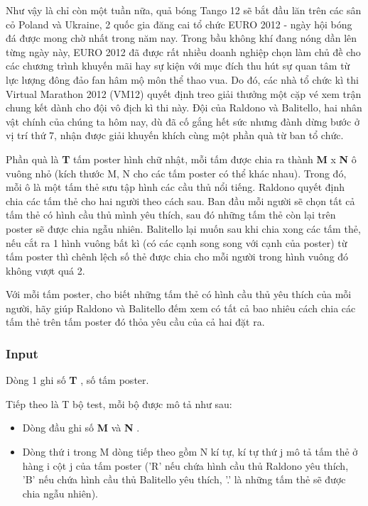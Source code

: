

Như vậy là chỉ còn một tuần nữa, quả bóng Tango 12 sẽ bắt đầu lăn trên các sân cỏ Poland và Ukraine, 2 quốc gia đăng cai tổ chức EURO 2012 - ngày hội bóng đá được mong chờ nhất trong năm nay. Trong bầu không khí đang nóng dần lên từng ngày này, EURO 2012 đã được rất nhiều doanh nghiệp chọn làm chủ đề cho các chương trình khuyến mãi hay sự kiện với mục đích thu hút sự quan tâm từ lực lượng đông đảo fan hâm mộ môn thể thao vua. Do đó, các nhà tổ chức kì thi Virtual Marathon 2012 (VM12) quyết định treo giải thưởng một cặp vé xem trận chung kết dành cho đội vô địch kì thi này. Đội của Raldono và Balitello, hai nhân vật chính của chúng ta hôm nay, dù đã cố gắng hết sức nhưng đành dừng bước ở vị trí thứ 7, nhận được giải khuyến khích cùng một phần quà từ ban tổ chức.





Phần quà là \textbf{ T } tấm poster hình chữ nhật, mỗi tấm được chia ra thành \textbf{ M } x \textbf{ N } ô vuông nhỏ (kích thước M, N cho các tấm poster có thể khác nhau). Trong đó, mỗi ô là một tấm thẻ sưu tập hình các cầu thủ nổi tiếng. Raldono quyết định chia các tấm thẻ cho hai người theo cách sau. Ban đầu mỗi người sẽ chọn tất cả tấm thẻ có hình cầu thủ mình yêu thích, sau đó những tấm thẻ còn lại trên poster sẽ được chia ngẫu nhiên. Balitello lại muốn sau khi chia xong các tấm thẻ, nếu cắt ra 1 hình vuông bất kì (có các cạnh song song với cạnh của poster) từ tấm poster thì chênh lệch số thẻ được chia cho mỗi người trong hình vuông đó không vượt quá 2.




Với mỗi tấm poster, cho biết những tấm thẻ có hình cầu thủ yêu thích của mỗi người, hãy giúp Raldono và Balitello đếm xem có tất cả bao nhiêu cách chia các tấm thẻ trên tấm poster đó thỏa yêu cầu của cả hai đặt ra.

\subsubsection{Input}

Dòng 1 ghi số \textbf{ T } , số tấm poster.

Tiếp theo là T bộ test, mỗi bộ được mô tả như sau:
\begin{itemize}
	\item Dòng đầu ghi số \textbf{ M } và \textbf{ N } .
\end{itemize}
\begin{itemize}
	\item Dòng thứ i trong M dòng tiếp theo gồm N kí tự, kí tự thứ j mô tả tấm thẻ ở hàng i cột j của tấm poster ('R' nếu chứa hình cầu thủ Raldono yêu thích, 'B' nếu chứa hình cầu thủ Balitello yêu thích, '.' là những tấm thẻ sẽ được chia ngẫu nhiên).
\end{itemize}

